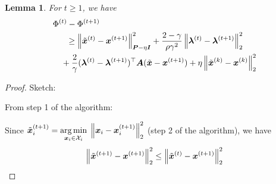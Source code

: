 \documentclass[twocolumn,amsthm]{autart}%
\theoremstyle{definition}
\theoremstyle{plain}
\newtheorem{theorem}{Theorem}
\newtheorem{lemma}{Lemma}
\begin{document}
\begin{lemma}
For $t \ge 1$, we have
\begin{equation}
\begin{multlined}
\Phi^{(t)} - \Phi^{(t+1)}  \\
\ge \norm{\xtil^{(t)}-\bbsym{x}^{(t+1)}}_{\bbsym{P}-\eta \bbsym{I}}^2
+ \frac{2-\gamma}{\rho \gamma^2} \norm{\bbsym{\lambda}^{(t)}-\bbsym{\lambda}^{(t+1)}}_2^2 \\
+ \frac{2}{\gamma} (\bbsym{\lambda}^{(t)}-\bbsym{\lambda}^{(t+1)})^\top \bbsym{A} (\xtil-\bbsym{x}^{(t+1)})
+ \eta \norm{\xtil^{(k)}-\bbsym{x}^{(k)}}_2^2
\end{multlined}
\end{equation}
\end{lemma}

\begin{proof}
Sketch:

From step 1 of the algorithm:

Since $\Tilde{\boldsymbol{x}}_i^{(t+1)} = \underset{\boldsymbol{x}_i \in \mathcal{X}_i}{\operatorname*{arg\,min}} \;\left\lVert \boldsymbol{x}_i - \boldsymbol{x}_i^{(t+1)} \right\rVert_2^2$ (step 2 of the algorithm), we have
\begin{equation}
\left\lVert \Tilde{\boldsymbol{x}}^{(t+1)} - \boldsymbol{x}^{(t+1)} \right\rVert_2^2 
\le \left\lVert \Tilde{\boldsymbol{x}}^{(t)} - \boldsymbol{x}^{(t+1)} \right\rVert_2^2 
\end{equation}
\end{proof}
\end{document}
